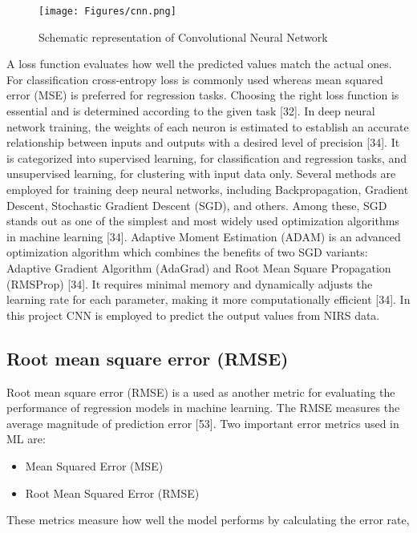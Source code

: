 \documentclass[12pt,a4paper]{report}
\begin{document}
\begin{figure}[h]
    \centering
    \texttt{[image: Figures/cnn.png]}
    \caption{Schematic representation of Convolutional Neural Network }
    \label{fig:cnn}
\end{figure}

A loss function evaluates how well the predicted values match the actual ones.  For classification cross-entropy loss is commonly used whereas mean squared error (MSE) is preferred for regression tasks. Choosing the right loss function is essential and is determined according to the given task [32]. In deep neural network training, the weights of each neuron is estimated to establish an accurate relationship between inputs and outputs with a desired level of precision [34].
It is categorized into supervised learning, for classification and regression tasks, and unsupervised learning, for clustering with input data only. Several methods are employed for training deep neural networks, including Backpropagation, Gradient Descent, Stochastic Gradient Descent (SGD), and others. Among these, SGD stands out as one of the simplest and most widely used optimization algorithms in machine learning [34]. Adaptive Moment Estimation (ADAM) is an advanced 
optimization algorithm which combines the benefits of two SGD variants: Adaptive Gradient Algorithm (AdaGrad) and Root Mean Square Propagation (RMSProp) [34]. It requires minimal memory and dynamically adjusts the learning rate for each parameter, making it more computationally efficient [34]. In this project CNN is employed to predict the output values from NIRS data. \\


\subsection*{Root mean square error (RMSE)}
Root mean square error (RMSE) is a used as another metric for evaluating the performance of regression models in machine learning. The RMSE measures the average magnitude of prediction error [53]. Two important error metrics used in ML are: \\

\begin{itemize}
    \item {Mean Squared Error (MSE)}
    \item {Root Mean Squared Error (RMSE)}
\end{itemize}

These metrics measure how well the model performs by calculating the error rate,
\end{document}
